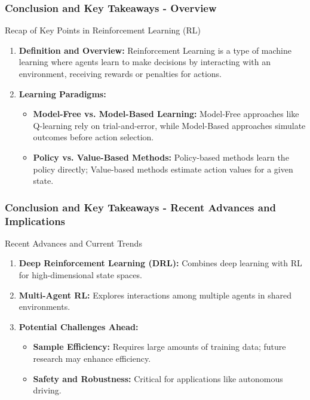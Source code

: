\documentclass{beamer}
\begin{document}
\begin{frame}[fragile]
    \frametitle{Conclusion and Key Takeaways - Overview}
    \begin{block}{Recap of Key Points in Reinforcement Learning (RL)}
        \begin{enumerate}
            \item \textbf{Definition and Overview:} 
            Reinforcement Learning is a type of machine learning where agents learn to make decisions by interacting with an environment, receiving rewards or penalties for actions.
            
            \item \textbf{Learning Paradigms:}
            \begin{itemize}
                \item \textbf{Model-Free vs. Model-Based Learning:} 
                Model-Free approaches like Q-learning rely on trial-and-error, while Model-Based approaches simulate outcomes before action selection.
                
                \item \textbf{Policy vs. Value-Based Methods:} 
                Policy-based methods learn the policy directly; Value-based methods estimate action values for a given state.
            \end{itemize}
        \end{enumerate}
    \end{block}
\end{frame}

\begin{frame}[fragile]
    \frametitle{Conclusion and Key Takeaways - Recent Advances and Implications}
    \begin{block}{Recent Advances and Current Trends}
        \begin{enumerate}
            \item \textbf{Deep Reinforcement Learning (DRL):} 
            Combines deep learning with RL for high-dimensional state spaces.
            
            \item \textbf{Multi-Agent RL:} 
            Explores interactions among multiple agents in shared environments.
        
            \item \textbf{Potential Challenges Ahead:}
            \begin{itemize}
                \item \textbf{Sample Efficiency:} Requires large amounts of training data; future research may enhance efficiency.
                \item \textbf{Safety and Robustness:} Critical for applications like autonomous driving.
            \end{itemize}
        \end{enumerate}
    \end{block}
\end{frame}
\end{document}
